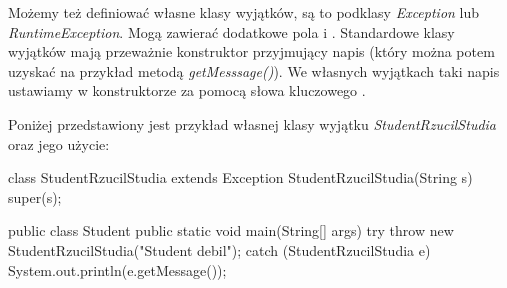 Możemy też definiować własne klasy wyjątków, są to podklasy \textit{Exception} lub \textit{RuntimeException}. Mogą zawierać dodatkowe pola i . Standardowe klasy wyjątków mają przeważnie konstruktor przyjmujący napis (który można potem uzyskać na przykład metodą \textit{getMesssage()}). We własnych wyjątkach taki napis ustawiamy w konstruktorze za pomocą słowa kluczowego .

\begin{example}
    Poniżej przedstawiony jest przykład własnej klasy wyjątku \textit{StudentRzucilStudia} oraz jego użycie:
    \begin{java}
        class StudentRzucilStudia extends Exception {
            StudentRzucilStudia(String s) {
                super(s);
            }
        }
    
        public class Student {
            public static void main(String[] args) {
                try {
                    throw new StudentRzucilStudia("Student debil");
                } catch (StudentRzucilStudia e) {
                    System.out.println(e.getMessage());
                }
            }
        }
    \end{java}
\end{example}

